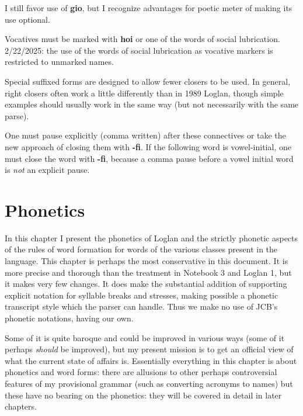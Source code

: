 \documentclass[12pt]{book}
\begin{document}
\begin{description}
I still favor use of {\bf gio}, but I recognize advantages for poetic meter of making its use optional.



\item[No unmarked vocatives:]  Vocatives must be marked with {\bf hoi} or one of the words of social lubrication.  2/22/2025:  the use of the words of social lubrication as vocative markers is restricted to unmarked names.

\item[Alternative closers for abstract descriptions, subordinate clauses:]  Special suffixed forms are designed to allow fewer closers to be used.  In general, right closers often work a little differently than in 1989 Loglan, though simple examples should usually work in the same way (but not necessarily with the same parse).

\item[One must pause after IPA, APA:]  One must pause explicitly (comma written) after these connectives or take the new approach of closing them with {\bf -fi}.  If the following word is vowel-initial, one must close the word with {\bf -fi}, because a comma pause before a vowel initial word is {\em not\/} an explicit pause.

\end{description}

\chapter{Phonetics}

In this chapter I present the phonetics of Loglan and the strictly phonetic aspects of the rules of word formation for words of the various classes present in the language.  This chapter is perhaps the  most conservative in this document.  It is more precise and thorough than the treatment in Notebook 3 and Loglan 1, but it makes very few changes.  It does make the substantial addition of supporting explicit notation for syllable breaks and stresses, making possible a phonetic transcript style which the parser can handle.  Thus we make no use of JCB's phonetic notations, having our own.

 Some of it is quite baroque and could be improved in various ways (some of it perhaps {\em should\/} be improved), but my present mission is to get an official view of what the current state of affairs is.   Essentially everything in this chapter  is about phonetics and word forms:  there are allusions to other perhaps controversial features of my provisional grammar (such as converting acronyms to names) but these have no bearing on the phonetics:  they will be covered in detail in later chapters.
\end{document}
